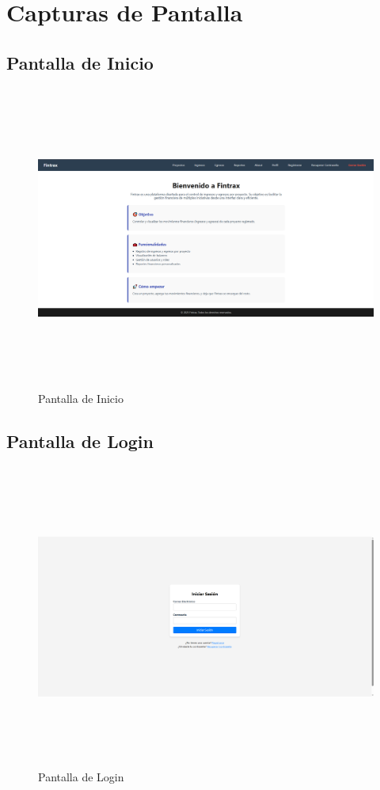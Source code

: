 \section{Capturas de Pantalla}

\subsection{Pantalla de Inicio}
\begin{figure}[H]
    \centering
    \includegraphics[width=15cm, height=10cm]{Archivos/Capturas/Home.png}
    \caption{Pantalla de Inicio}
    \label{fig:inicio}
\end{figure}

\subsection{Pantalla de Login}
\begin{figure}[H]
    \centering
    \includegraphics[width=15cm, height=10cm]{Archivos/Capturas/Login.png}
    \caption{Pantalla de Login}
    \label{fig:login}
\end{figure}

